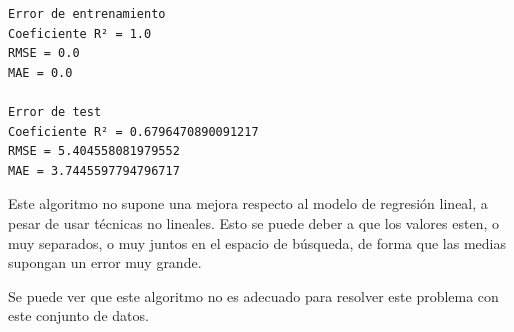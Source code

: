 \documentclass[11pt]{article}
\begin{document}
    \begin{Verbatim}[commandchars=\\\{\}]
Error de entrenamiento
Coeficiente R² = 1.0
RMSE = 0.0
MAE = 0.0

Error de test
Coeficiente R² = 0.6796470890091217
RMSE = 5.404558081979552
MAE = 3.7445597794796717
    \end{Verbatim}

    Este algoritmo no supone una mejora respecto al modelo de regresión
lineal, a pesar de usar técnicas no lineales. Esto se puede deber a que
los valores esten, o muy separados, o muy juntos en el espacio de
búsqueda, de forma que las medias supongan un error muy grande.

Se puede ver que este algoritmo no es adecuado para resolver este
problema con este conjunto de datos.


\end{document}
